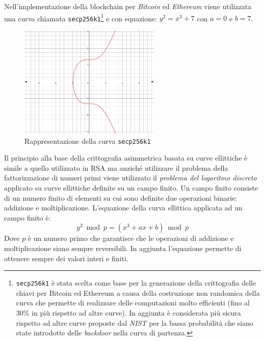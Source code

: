 Nell'implementazione della blockchain per \textit{Bitcoin} ed \textit{Ethereum} viene utilizzata una curva chiamata \texttt{secp256k1}\footnote{\texttt{secp256k1} è stata scelta come base per la generazione della crittografia delle chiavi per Bitcoin ed Ethereum a causa della costruzione non randomica della curva che permette di realizzare delle computazioni molto efficienti (fino al 30\% in più rispetto ad altre curve). In aggiunta è considerata più sicura rispetto ad altre curve proposte dal \textit{NIST} per la bassa probabilità che siano state introdotte delle \textit{backdoor} nella curva di partenza.} e con equazione: $y^2=x^3+7$ con $a=0$ e $b=7$.\newline
\begin{figure}
    \centering
    \includegraphics[width=0.6\textwidth]{images/secp256k1.png}
    \caption{Rappresentazione della curva \texttt{secp256k1}}
\end{figure}
Il principio alla base della crittografia asimmetrica basata su curve ellittiche è simile a quello utilizzato in RSA ma anziché utilizzare il problema della fattorizzazione di numeri primi viene utilizzato il \textit{problema del logaritmo discreto} applicato su curve ellittiche definite su un campo finito.\newline
Un campo finito consiste di un numero finito di elementi su cui sono definite due operazioni binarie: addizione e moltiplicazione. L'equazione della curva ellittica applicata ad un campo finito è:
\begin{equation}
    y^2 \bmod p = (x^3 + ax + b) \bmod p
\end{equation}
Dove $p$ è un numero primo che garantisce che le operazioni di addizione e moltiplicazione siano sempre reversibili. In aggiunta l'equazione permette di ottenere sempre dei valori interi e finiti.\newline\newline
